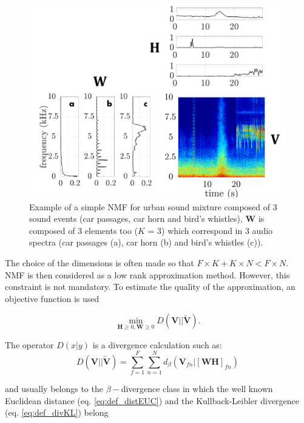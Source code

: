 \documentclass[twocolumn,a4paper,10pt]{article}
\begin{document}
\begin{figure}[t]
\centering
\includegraphics[width=0.9\linewidth]{figures/schema_introduction_nmf.pdf}
\caption{Example of a simple NMF for urban sound mixture composed of 3 sound events (car passages, car horn and bird's whistles), $\mathbf{W}$ is composed of 3 elements too ($K$ = 3) which correspond in 3 audio spectra (car passages (a), car horn (b) and bird's whistles (c)).}
\label{fig:example_NMF}
\end{figure}

The choice of the dimensions is often made so that $F\times K + K \times N < F \times N$. NMF is then considered as a low rank approximation method. However, this constraint is not mandatory. To estimate the quality of the approximation, an objective function is used

\begin{equation}\label{eq:min-D-WH}
\underset{\mathbf{H} \geq 0, \mathbf{W} \geq 0}{\min} D\left(\mathbf{V} \vert \vert \mathbf{\tilde{V}}\right).
\end{equation}

The operator $D(x\vert y)$ is a divergence calculation such as:
\begin{equation}
D\left(\textbf{V} \vert\vert \mathbf{\tilde{V}} \right) = \sum_{f = 1}^{F} \sum_{n = 1}^{N} d_{\beta}
\left(\textbf{V}_{fn} \vert \left[ \textbf{WH} \right]_{fn} \right)
\end{equation}

and usually belongs to the $\beta-$divergence class \cite{fevotte_nonnegative_2009} in which the well known Euclidean distance (eq. \ref{eq:def_distEUC}) and the Kullback-Leibler divergence (eq. \ref{eq:def_divKL}) belong
\end{document}
